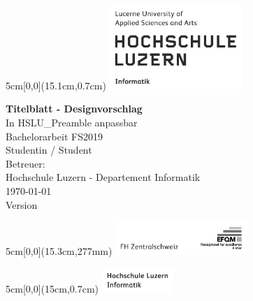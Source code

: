 \begin{titlepage}
	\begin{textblock*}{5cm}[0,0](15.1cm,0.7cm)
		\includegraphics[keepaspectratio,width=5cm]{img/HSLU_Logo}
	\end{textblock*}
	\begin{center}
		\vspace*{5cm}
		\Huge{\textbf{Titelblatt - Designvorschlag}} \\
		\Large{In HSLU\_Preamble anpassbar}\\
		\vspace{0.5em}
		\Large{Bachelorarbeit FS2019}\\
		\vspace{3em}
		\LARGE{Studentin / Student}\\
		\vspace{1em}
		\Large{Betreuer: }\\
		\vfill
		\large{Hochschule Luzern - Departement Informatik}\\
		\large{\today}\\
		\large{Version \docversion}
	\end{center}
	\begin{textblock*}{5cm}[0,0](15.3cm,277mm)
		\includegraphics[keepaspectratio,width=5cm]{img/FHZ_Logo}
	\end{textblock*}
\end{titlepage}

\newpage


\begin{textblock*}{5cm}[0,0](15cm,0.7cm)
	\includegraphics[keepaspectratio,width=2.7cm]{img/HSLU_Logo_Header}
\end{textblock*}

\vspace*{1.35cm}

